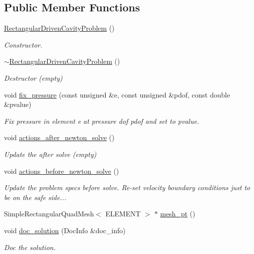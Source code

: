 \subsection*{Public Member Functions}
\begin{DoxyCompactItemize}
\item 
\hyperlink{classRectangularDrivenCavityProblem_ad7382f68a780f86ea5f0e9b7d4d119ec}{Rectangular\+Driven\+Cavity\+Problem} ()
\begin{DoxyCompactList}\small\item\em Constructor. \end{DoxyCompactList}\item 
\hyperlink{classRectangularDrivenCavityProblem_a0233981e33e2bd9db424b19e51a0faef}{$\sim$\+Rectangular\+Driven\+Cavity\+Problem} ()
\begin{DoxyCompactList}\small\item\em Destructor (empty) \end{DoxyCompactList}\item 
void \hyperlink{classRectangularDrivenCavityProblem_ac02d80f5241eeb04571577ce3b9f35a3}{fix\+\_\+pressure} (const unsigned \&e, const unsigned \&pdof, const double \&pvalue)
\begin{DoxyCompactList}\small\item\em Fix pressure in element e at pressure dof pdof and set to pvalue. \end{DoxyCompactList}\item 
void \hyperlink{classRectangularDrivenCavityProblem_abfe87f7dec89dcf897f4df475685e039}{actions\+\_\+after\+\_\+newton\+\_\+solve} ()
\begin{DoxyCompactList}\small\item\em Update the after solve (empty) \end{DoxyCompactList}\item 
void \hyperlink{classRectangularDrivenCavityProblem_ab60d1a663d82616c27b9d11bc46c05a4}{actions\+\_\+before\+\_\+newton\+\_\+solve} ()
\begin{DoxyCompactList}\small\item\em Update the problem specs before solve. Re-\/set velocity boundary conditions just to be on the safe side... \end{DoxyCompactList}\item 
Simple\+Rectangular\+Quad\+Mesh$<$ E\+L\+E\+M\+E\+NT $>$ $\ast$ \hyperlink{classRectangularDrivenCavityProblem_a408035d1f224641db75a2f48074e9593}{mesh\+\_\+pt} ()
\item 
void \hyperlink{classRectangularDrivenCavityProblem_ab9540b4f539b7d62a1165cc42b4190ea}{doc\+\_\+solution} (Doc\+Info \&doc\+\_\+info)
\begin{DoxyCompactList}\small\item\em Doc the solution. \end{DoxyCompactList}\end{DoxyCompactItemize}


